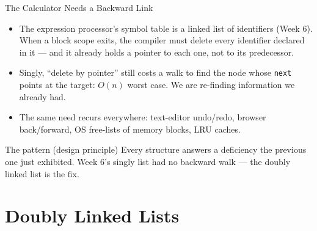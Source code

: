 \documentclass[aspectratio=169]{beamer}
\begin{document}
\begin{frame}{The Calculator Needs a Backward Link}
  \begin{itemize}
    \item The expression processor's symbol table is a linked list of
      identifiers (Week 6). When a block scope exits, the compiler must delete
      every identifier declared in it --- and it already holds a pointer to
      each one, not to its predecessor.
    \item Singly, ``delete by pointer'' still costs a walk to find the node
      whose \texttt{next} points at the target: $O(n)$ worst case. We are
      re-finding information we already had.
    \item The same need recurs everywhere: text-editor undo/redo, browser
      back/forward, OS free-lists of memory blocks, LRU caches.
  \end{itemize}
  \begin{exampleblock}{The pattern (design principle)}
    Every structure answers a deficiency the previous one just exhibited.
    Week 6's singly list had no backward walk --- the doubly linked list is the
    fix.
  \end{exampleblock}
\end{frame}


\section{Doubly Linked Lists}

\end{document}
